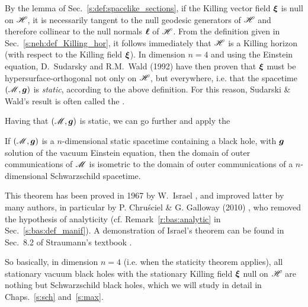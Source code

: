 By the lemma of Sec.~\ref{s:def:spacelike_sections}, if the Killing vector
field $\bm{\xi}$ is null on $\mathscr{H}$, it is necessarily tangent to the null geodesic generators
of $\mathscr{H}$ and therefore collinear to the null normals $\bm{\ell}$ of $\mathscr{H}$. From the definition
given in Sec.~\ref{s:neh:def_Killing_hor}, it follows immediately that
$\mathscr{H}$ is a Killing horizon (with respect to the Killing field $\bm{\xi}$).
In dimension $n=4$ and using the Einstein equation,
D.~Sudarsky and R.M.~Wald (1992) \cite{SudarW92} have then proven that $\bm{\xi}$ must be
hypersurface-orthogonal not only on $\mathscr{H}$,
but  everywhere, i.e. that the spacetime $(\mathscr{M},\bm{g})$ is
\emph{static}, according to the above definition.
For this reason, Sudarski \& Wald's result is often
called the .

Having that $(\mathscr{M},\bm{g})$ is static, we can go further and
apply the
\begin{greybox}[frametitle={Israel uniqueness theorem:}]
If $(\mathscr{M},\bm{g})$ is a $n$-dimensional static spacetime
containing a black hole, with $\bm{g}$ solution of the vacuum Einstein
equation, then the domain of outer communications of $\mathscr{M}$ is isometric
to the domain of outer communications of a $n$-dimensional Schwarzschild spacetime.
\end{greybox}
This theorem has been proved in 1967 by W.~Israel \cite{Israe67},
and improved latter by many authors, in particular by
P. Chru\'sciel \& G. Galloway (2010) \cite{ChrusG10}, who removed
the hypothesis of analyticity (cf. Remark~\ref{r:bas:analytic} in Sec.~\ref{s:bas:def_manif}).
A demonstration of Israel's theorem can be found in Sec.~8.2 of
Straumann's textbook \cite{Strau13}.

So basically, in dimension $n=4$ (i.e. when the staticity theorem applies), all stationary vacuum black holes with the stationary Killing field $\bm{\xi}$ null
on $\mathscr{H}$ are nothing but Schwarzschild black holes, which we will study in detail in Chaps.~\ref{s:sch} and~\ref{s:max}.



